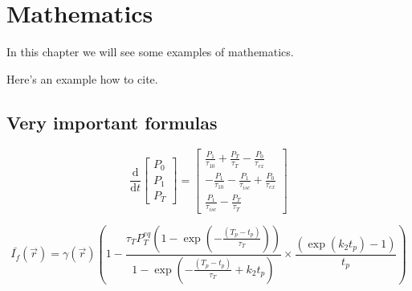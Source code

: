 \chapter{Mathematics}
In this chapter we will see some examples of mathematics.

Here's an example how to cite.~\cite{atc13}

\lipsum[1]

\section{Very important formulas}
\lipsum[2]

\begin{equation}\label{eqn:rate_eqns}
\frac{\textrm{d}}{\textrm{d}t}\left[
\begin{array}{l}
P_{\textit{0}} \\
P_{\textit{1}} \\
P_{\textit{T}}
\end{array}
\right] =
\left[
\begin{array}{l}
\frac{P_{\textit{1}}}{\tau_{\textit{10}}} + \frac{P_{\textit{T}}}{\tau_{\textit{T}}} - \frac{P_{\textit{0}}}{\tau_{\textit{ex}}} \\
- \frac{P_{\textit{1}}}{\tau_{\textit{10}}} - \frac{P_{\textit{1}}}{\tau_{isc}} + \frac{P_{\textit{0}}}{\tau_{\textit{ex}}} \\
\frac{P_{\textit{1}}}{\tau_{isc}} -  \frac{P_{\textit{T}}}{\tau_{\textit{T}}}
\end{array}
\right]
\end{equation}

\lipsum[3]


\begin{equation}\label{eqn:avgfluorescence}
\bar{I_{f}}(\vec{r})
	= \gamma(\vec{r}) \left(1 - \frac{\tau_{\textit{T}} P_{\textit{T}}^{{eq}}\left(1-\exp \left(-\frac{(T_p - t_p)}{\tau_{\textit{T}}}\right)\right)}{1-\exp\left(-\frac{(T_p - t_p)}{\tau_{\textit{T}}} + k_{\textit{2}} t_p\right)} \times \frac{\left(\exp\left(k_{\textit{2}} t_p\right)-1\right)}{t_p} \right)
\end{equation}

\lipsum[3]
